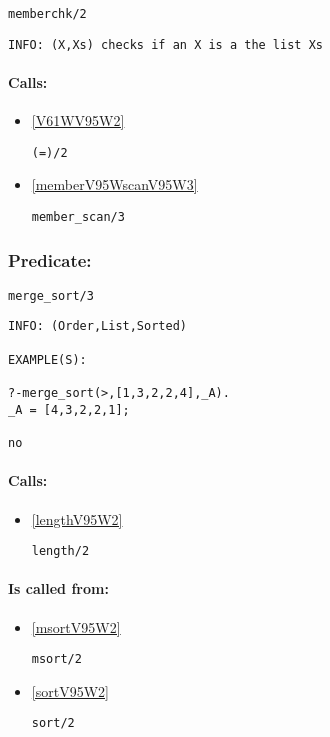 \begin{verbatim}
memberchk/2
\end{verbatim}

{\small \begin{verbatim}
INFO: (X,Xs) checks if an X is a the list Xs

\end{verbatim}}
\paragraph{Calls:} 
\begin{itemize}
\item \ref{V61WV95W2} 
\begin{verbatim}
(=)/2
\end{verbatim}

\item \ref{memberV95WscanV95W3} 
\begin{verbatim}
member_scan/3
\end{verbatim}

\end{itemize}

\subsubsection{Predicate:} \label{mergeV95WsortV95W3}

\begin{verbatim}
merge_sort/3
\end{verbatim}

{\small \begin{verbatim}
INFO: (Order,List,Sorted)

EXAMPLE(S):

?-merge_sort(>,[1,3,2,2,4],_A).
_A = [4,3,2,2,1];

no

\end{verbatim}}
\paragraph{Calls:} 
\begin{itemize}
\item \ref{lengthV95W2} 
\begin{verbatim}
length/2
\end{verbatim}

\end{itemize}
\paragraph{Is called from:} 
\begin{itemize}
\item \ref{msortV95W2} 
\begin{verbatim}
msort/2
\end{verbatim}

\item \ref{sortV95W2} 
\begin{verbatim}
sort/2
\end{verbatim}

\end{itemize}


